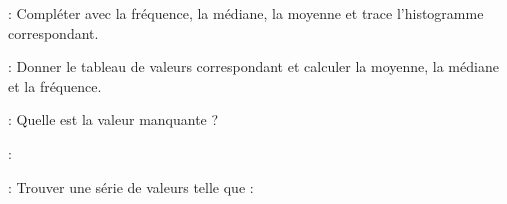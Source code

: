  : Compléter avec la fréquence, la médiane, la moyenne et trace l'histogramme correspondant.

 : Donner le tableau de valeurs correspondant et calculer la moyenne, la médiane et la fréquence.

 : Quelle est la valeur manquante ?

 : 

 : Trouver une série de valeurs telle que :




